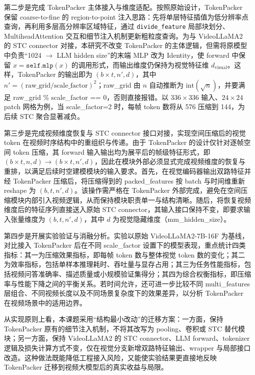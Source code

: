 第二步是完成 TokenPacker 主体接入与维度适配。按照原始设计，TokenPacker 保留 coarse-to-fine 的 region-to-point 注入思路：先将单层特征插值为低分辨率点查询，再利用多层高分辨率区域特征，通过 \texttt{divide\_feature} 局部块划分、MultiheadAttention 交互和细节注入机制更新粗粒度查询\cite{tokenpacker2024}。为与 VideoLLaMA2 的 STC connector 对接，本研究不改变 TokenPacker 的主体逻辑，但需将原模型中负责“1024 $\to$ LLM hidden size”的末端 MLP 改为 Identity，使 forward 中保留 $x=\texttt{self.mlp}(x)$ 的调用形式，而输出维度仍保持为视觉特征维 $d_{\text{visual}}$。这样，TokenPacker 的输出即为 $(b\times t,n',d)$，其中 $n'=(\text{raw\_grid}/\text{scale\_factor})^2$；raw\_grid 由 $n$ 自动推断为 $\mathrm{int}(\sqrt{n})$，并要满足 raw\_grid \% scale\_factor == 0，否则直接报错。以 $336\times336$ 输入、$24\times24$ patch 网格为例，当 scale\_factor=2 时，每帧 token 数将从 576 压缩到 144，为后续 STC 聚合显著减负。

第三步是完成视频维度恢复与 STC connector 接口对接，实现空间压缩后的视觉 token 在视频时序结构中的重组织与传递。由于 TokenPacker 的设计仅针对逐帧空间 token 压缩，其 forward 输入输出均为展平后的帧级特征形式，即 $(b\times t,n,d)\to(b\times t,n',d)$，因此在模块外部必须显式完成视频维度的恢复与重排，以满足后续时空建模模块的输入要求。首先，在视觉编码器输出双路特征并经 TokenPacker 压缩后，将压缩得到的 packed\_features 按 batch 与时间维重新 reshape 为 $(b,t,n',d)$。该操作需严格在 TokenPacker 外部完成，避免在空间压缩模块内部引入视频逻辑，从而保持模块职责单一与结构清晰。随后，将恢复视频维度后的特征序列直接送入原始 STC connector，其输入接口保持不变，即要求输入张量维度为 $(b,t,n',d)$，其中 $d$ 为视觉隐藏维度（mm\_hidden\_size）。

第四步是开展实验验证与消融分析。实验以原始 VideoLLaMA2-7B-16F 为基线，对比接入 TokenPacker 后在不同 scale\_factor 设置下的模型表现，重点统计四类指标：其一为压缩效果指标，即每帧 token 数与整体视觉 token 数的变化；其二为效率指标，包括单样本推理耗时、吞吐量与显存占用；其三为任务性能指标，包括视频问答准确率、描述质量或小规模验证集得分；其四为综合权衡指标，即压缩率与性能下降之间的平衡关系。若时间允许，还可进一步比较不同 multi\_features 层组合、不同视频长度以及不同场景复杂度下的效果差异，以分析 TokenPacker 在视频场景中的适用边界。

从实现原则上看，本课题采用“结构最小改动”的迁移方案：一方面，保持 TokenPacker 原有的细节注入机制，不将其改写为 pooling、卷积或 STC 替代模块；另一方面，保持 VideoLLaMA2 的 STC connector、LLM forward、tokenizer 逻辑及损失计算方式不变，仅在视觉分支新增双路特征输出、wrapper 与局部接口改造\cite{tokenpacker2024,videollama22024}。这种做法既能降低工程接入风险，又能使实验结果更直接地反映 TokenPacker 迁移到视频大模型后的真实收益与局限。

